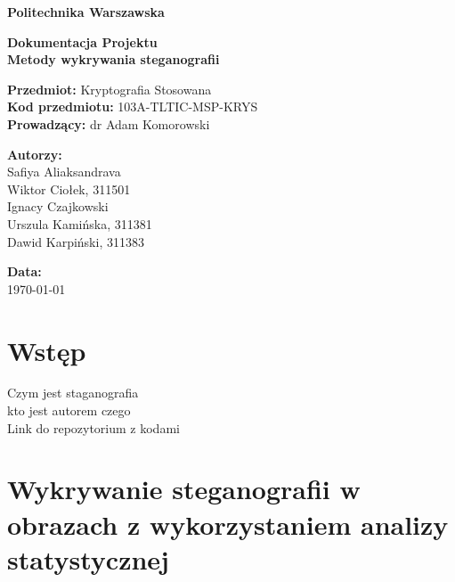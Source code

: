 \documentclass[a4paper,12pt]{article}
\begin{document}
\begin{titlepage}
	\begin{center}
		\vspace*{1cm}

		\textbf{\Huge Politechnika Warszawska}\\
		\vspace{2cm}

		\textbf{\LARGE Dokumentacja Projektu}\\
		\vspace{0.5cm}
		\textbf{\Large Metody wykrywania steganografii}\\

		\vspace{2cm}

		\textbf{Przedmiot:} Kryptografia Stosowana \\
		\textbf{Kod przedmiotu:} 103A-TLTIC-MSP-KRYS \\
		\textbf{Prowadzący:} dr Adam Komorowski \\

		\vfill

		\textbf{Autorzy:}\\
		\vspace{0.5cm}
		Safiya Aliaksandrava\\
		Wiktor Ciołek, 311501\\
		Ignacy Czajkowski\\
		Urszula Kamińska, 311381\\
		Dawid Karpiński, 311383\\

		\vspace{1cm}

		\textbf{Data:} \\
		\today

		\vspace{2cm}
	\end{center}
\end{titlepage}

\section{Wstęp}
Czym jest staganografia\\
kto jest autorem czego\\
Link do repozytorium z kodami

\clearpage
\section{Wykrywanie steganografii w obrazach z wykorzystaniem analizy statystycznej} 

\end{document}
